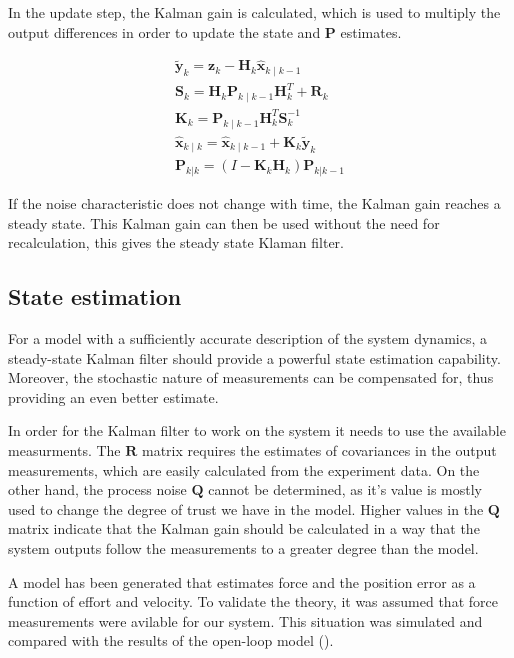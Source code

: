 In the update step, the Kalman gain is calculated, which is used to multiply the output differences in order to update the state and $\mathbf{P}$  estimates.

\begin{gather}
\tilde{\mathbf{y}}_k = \mathbf{z}_k - \mathbf{H}_k\hat{\mathbf{x}}_{k\mid k-1}\\
\mathbf{S}_k = \mathbf{H}_k \mathbf{P}_{k\mid k-1} \mathbf{H}_k^T + \mathbf{R}_k\\
\mathbf{K}_k = \mathbf{P}_{k\mid k-1}\mathbf{H}_k^T \mathbf{S}_k^{-1}\\
\hat{\mathbf{x}}_{k\mid k} = \hat{\mathbf{x}}_{k\mid k-1} + \mathbf{K}_k\tilde{\mathbf{y}}_k \\
\mathbf{P}_{k|k} = (I - \mathbf{K}_k \mathbf{H}_k) \mathbf{P}_{k|k-1} 
\end{gather}

If the noise characteristic does not change with time, the Kalman gain reaches a steady state.
This Kalman gain can then be used without the need for recalculation, this gives the steady state Klaman filter.

\subsection{State estimation}
For a model with a sufficiently accurate  description of the system dynamics, a steady-state Kalman filter should provide a powerful state estimation capability.
Moreover, the stochastic nature of measurements can be compensated for, thus providing an even better estimate.

In order for the Kalman filter to work on the system it needs to use the available measurments.
The $\mathbf{R}$ matrix requires the estimates of covariances in the output measurements, which are easily calculated from the experiment data.
On the other hand, the process noise $\mathbf{Q}$ cannot be determined, as it's value is mostly used to change the degree of trust we have in the model. 
Higher values in the $\mathbf{Q}$ matrix indicate that the Kalman gain should be calculated in a way that the system outputs follow the measurements to a greater degree than the model.

A model has been generated that estimates force and the position error as a function of effort and velocity.
To validate the theory, it was assumed that force measurements were avilable for our system.
This situation was simulated and compared with the results of the open-loop model ().

